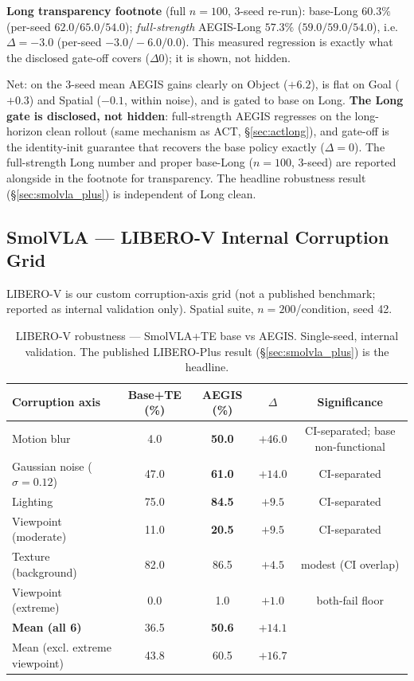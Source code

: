 \documentclass[11pt,a4paper]{article}
\newcommand{\win}[1]{{\color{frozengreen}\textbf{#1}}}
\begin{document}
\noindent\textbf{Long transparency footnote} (full $n=100$, 3-seed re-run): base-Long
$\mathbf{60.3\%}$ (per-seed $62.0/65.0/54.0$); \emph{full-strength} AEGIS-Long
$\mathbf{57.3\%}$ ($59.0/59.0/54.0$), i.e.\ $\Delta = -3.0$ (per-seed $-3.0/-6.0/0.0$).
This measured regression is exactly what the disclosed gate-off covers ($\Delta 0$); it is
shown, not hidden.

Net: on the 3-seed mean AEGIS gains clearly on Object ($+6.2$), is flat on Goal ($+0.3$) and
Spatial ($-0.1$, within noise), and is gated to base on Long. \textbf{The Long gate is disclosed,
not hidden}: full-strength AEGIS regresses on the long-horizon clean rollout (same mechanism as
ACT, §\ref{sec:actlong}), and gate-off is the identity-init guarantee that recovers the base
policy exactly ($\Delta=0$). The full-strength Long number and proper base-Long ($n=100$, 3-seed)
are reported alongside in the footnote for transparency. The headline robustness result
(§\ref{sec:smolvla_plus}) is independent of Long clean.

\subsection{SmolVLA — LIBERO-V Internal Corruption Grid}
\label{sec:smolvla_liberov}

LIBERO-V is our custom corruption-axis grid (not a published benchmark; reported as
internal validation only). Spatial suite, $n=200$/condition, seed 42.

\begin{table}[H]
\centering
\caption{LIBERO-V robustness — SmolVLA+TE base vs AEGIS. Single-seed, internal validation.
The published LIBERO-Plus result (\S\ref{sec:smolvla_plus}) is the headline.}
\label{tab:smolvla_liberov}
\small
\begin{tabular}{lcccc}
\toprule
Corruption axis & Base+TE (\%) & AEGIS (\%) & $\Delta$ & Significance \\
\midrule
Motion blur     & 4.0  & \win{50.0} & $+46.0$ & CI-separated; base non-functional \\
Gaussian noise ($\sigma=0.12$) & 47.0 & \win{61.0} & $+14.0$ & CI-separated \\
Lighting        & 75.0 & \win{84.5} & $+9.5$  & CI-separated \\
Viewpoint (moderate) & 11.0 & \win{20.5} & $+9.5$ & CI-separated \\
Texture (background) & 82.0 & 86.5 & $+4.5$ & modest (CI overlap) \\
Viewpoint (extreme) & 0.0 & 1.0 & $+1.0$ & both-fail floor \\
\midrule
\textbf{Mean (all 6)} & 36.5 & \win{50.6} & $+14.1$ & \\
Mean (excl. extreme viewpoint) & 43.8 & 60.5 & $+16.7$ & \\
\bottomrule
\end{tabular}
\end{table}
\end{document}

